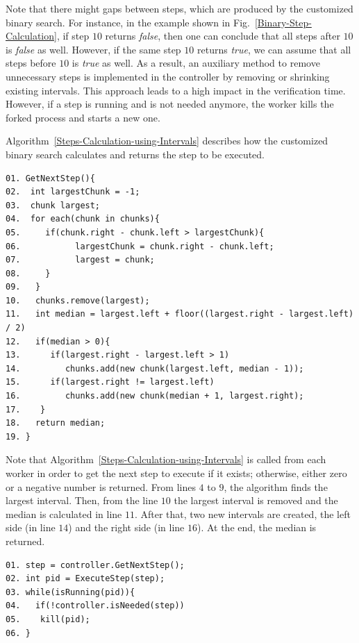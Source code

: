 Note that there might gaps between steps, which are produced by the customized binary search. For instance, in the example shown in Fig.~\ref{Binary-Step-Calculation}, if step $10$ returns \textit{false}, then one can conclude that all steps after $10$ is \textit{false} as well. However, if the same step $10$ returns \textit{true}, we can assume that all steps before $10$ is \textit{true} as well. As a result, an auxiliary method to remove unnecessary steps is implemented in the controller by removing or shrinking existing intervals. This approach leads to a high impact in the verification time. However, if a step is running and is not needed anymore, the worker kills the forked process and starts a new one.

Algorithm~\ref{Steps-Calculation-using-Intervals} describes how the customized binary search calculates and returns the step to be executed. 

\begin{lstlisting}[caption=Steps Calculation using Intervals,label=Steps-Calculation-using-Intervals]
01. GetNextStep(){
02.  int largestChunk = -1;
03.  chunk largest;
04.  for each(chunk in chunks){
05.     if(chunk.right - chunk.left > largestChunk){
06.           largestChunk = chunk.right - chunk.left;
07.           largest = chunk;
08.     }
09.   }	
10.   chunks.remove(largest);	
11.   int median = largest.left + floor((largest.right - largest.left) / 2)
12.   if(median > 0){
13.      if(largest.right - largest.left > 1)
14.         chunks.add(new chunk(largest.left, median - 1));	
15.      if(largest.right != largest.left)
16.         chunks.add(new chunk(median + 1, largest.right);
17.    }
18.   return median;
19. }
\end{lstlisting}

Note that Algorithm~\ref{Steps-Calculation-using-Intervals} is called from each worker in order to get the next step to execute if it exists; otherwise, either zero or a negative number is returned.
From lines $4$ to $9$, the algorithm finds the largest interval. Then, from the line $10$ the largest interval is removed and the median is calculated in line $11$. After that, two new intervals are created, the left side (in line $14$) and the right side (in line $16$). At the end, the median is returned.

\begin{lstlisting}[caption=Worker sample,label=worker-sample]
01. step = controller.GetNextStep();
02. int pid = ExecuteStep(step);
03. while(isRunning(pid)){
04.   if(!controller.isNeeded(step))
05.    kill(pid);
06. }     
\end{lstlisting}

